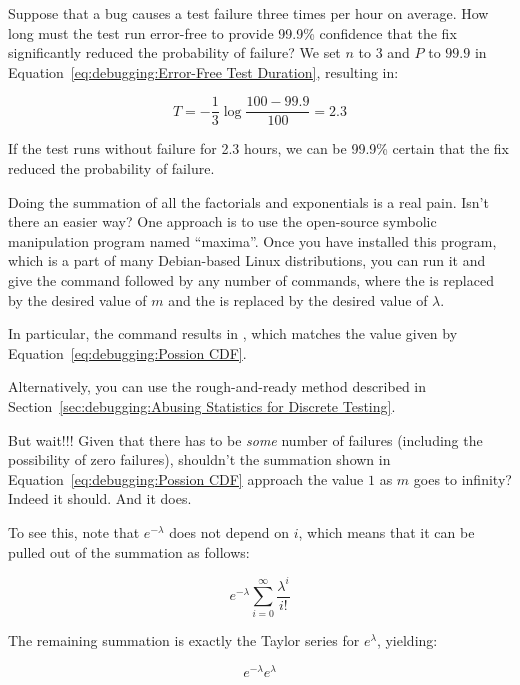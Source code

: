 \QuickQ{}
	Suppose that a bug causes a test failure three times per hour
	on average.
	How long must the test run error-free to provide 99.9\%
	confidence that the fix significantly reduced the probability
	of failure?
\QuickA{}
	We set $n$ to $3$ and $P$ to $99.9$ in
	Equation~\ref{eq:debugging:Error-Free Test Duration}, resulting in:

	\begin{equation}
		T = - \frac{1}{3} \log \frac{100 - 99.9}{100} = 2.3
	\end{equation}

	If the test runs without failure for 2.3 hours, we can be 99.9\%
	certain that the fix reduced the probability of failure.

\QuickQ{}
	Doing the summation of all the factorials and exponentials
	is a real pain.
	Isn't there an easier way?
\QuickA{}
	One approach is to use the open-source symbolic manipulation
	program named ``maxima''.
	Once you have installed this program, which is a part of many
	Debian-based Linux distributions, you can run it and give the
	 command followed by any number of
	 commands, where the 
	is replaced by the desired value of $m$ and the 
	is replaced by the desired value of $\lambda$.

	In particular, the  command
	results in , which matches the value
	given by Equation~\ref{eq:debugging:Possion CDF}.

	Alternatively, you can use the rough-and-ready method described in
	Section~\ref{sec:debugging:Abusing Statistics for Discrete Testing}.

\QuickQ{}
	But wait!!!
	Given that there has to be \emph{some} number of failures
	(including the possibility of zero failures),
	shouldn't the summation shown in
	Equation~\ref{eq:debugging:Possion CDF}
	approach the value $1$ as $m$ goes to infinity?
\QuickA{}
	Indeed it should.
	And it does.

	To see this, note that $e^{-\lambda}$ does not depend on $i$,
	which means that it can be pulled out of the summation as follows:

	\begin{equation}
		e^{-\lambda} \sum_{i=0}^\infty \frac{\lambda^i}{i!}
	\end{equation}

	The remaining summation is exactly the Taylor series for
	$e^\lambda$, yielding:

	\begin{equation}
		e^{-\lambda} e^\lambda
	\end{equation}

